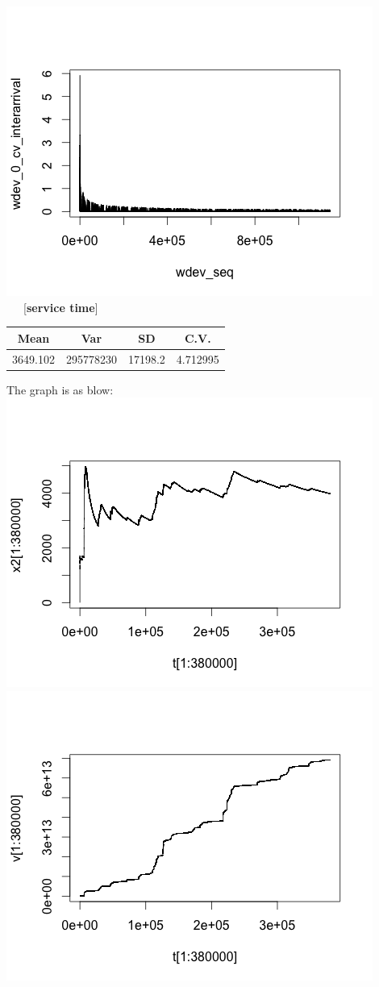 \documentclass[11pt]{article}
\begin{document}
\includegraphics[scale=0.5]{CV1.png} \\
~~~[\textbf{service time}] 
\begin{center}
\begin{tabular}{c|c|c|c}
Mean & Var & SD & C.V. \\
\hline
3649.102 & 295778230 & 17198.2 & 4.712995 \\
\end{tabular}
\end{center}
The graph is as blow: \\
\includegraphics[scale=0.5]{mean2.png}
\includegraphics[scale=0.5]{v2.png}  \\
\end{document}
